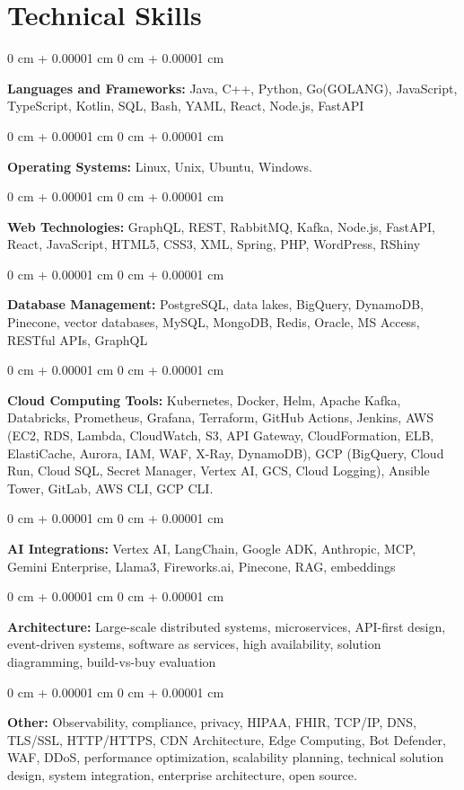 \documentclass[10pt, letterpaper]{article}
\newenvironment{onecolentry}{
    \begin{adjustwidth}{
        0 cm + 0.00001 cm
    }{
        0 cm + 0.00001 cm
    }
}{
    \end{adjustwidth}
} %
\begin{document}
    \section{Technical Skills}
    \vspace{2 pt }
    \begin{onecolentry}
    \textbf{Languages and Frameworks:} Java, C++, Python, Go(GOLANG), JavaScript, TypeScript, Kotlin, SQL, Bash, YAML, React, Node.js, FastAPI
    \end{onecolentry}
    \begin{onecolentry}
        \textbf{Operating Systems:} Linux, Unix, Ubuntu, Windows.
    \end{onecolentry}
    \begin{onecolentry}
         \textbf{Web Technologies:} GraphQL, REST, RabbitMQ, Kafka, Node.js, FastAPI, React, JavaScript, HTML5, CSS3, XML, Spring, PHP, WordPress, RShiny
    \end{onecolentry}
    \begin{onecolentry}
        \textbf{Database Management:} PostgreSQL, data lakes, BigQuery, DynamoDB, Pinecone, vector databases, MySQL, MongoDB, Redis, Oracle, MS Access, RESTful APIs, GraphQL
    \end{onecolentry}
    \begin{onecolentry}
        \textbf{Cloud Computing Tools:}
Kubernetes, Docker, Helm, Apache Kafka, Databricks, Prometheus, Grafana, Terraform, GitHub Actions, Jenkins, AWS (EC2, RDS, Lambda, CloudWatch, S3, API Gateway, CloudFormation, ELB, ElastiCache, Aurora, IAM, WAF, X-Ray, DynamoDB), GCP (BigQuery, Cloud Run, Cloud SQL, Secret Manager, Vertex AI, GCS, Cloud Logging), Ansible Tower, GitLab, AWS CLI, GCP CLI.
    \end{onecolentry}
    \begin{onecolentry}
         \textbf{AI Integrations:} Vertex AI, LangChain, Google ADK, Anthropic, MCP, Gemini Enterprise, Llama3, Fireworks.ai, Pinecone, RAG, embeddings
    \end{onecolentry}
    \begin{onecolentry}
        \textbf{Architecture:} Large-scale distributed systems, microservices, API-first design, event-driven systems, software as services, high availability, solution diagramming, build-vs-buy evaluation
    \end{onecolentry}
        \begin{onecolentry}
     \textbf{Other:} Observability, compliance, privacy, HIPAA, FHIR, TCP/IP, DNS, TLS/SSL, HTTP/HTTPS, CDN Architecture, Edge Computing, Bot Defender, WAF, DDoS, performance optimization, scalability planning, technical solution design, system integration, enterprise architecture, open source.
    \end{onecolentry}
\end{document}
